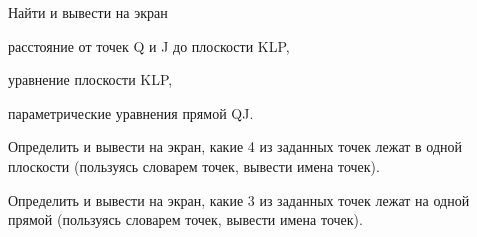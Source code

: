\documentclass[11pt]{report}
\begin{document}
 
Найти и вывести на экран


расстояние от точек Q и J до плоскости KLP,

 
уравнение плоскости KLP,

 
параметрические уравнения прямой QJ.


Определить и вывести на экран, какие 4 из заданных точек лежат в одной плоскости (пользуясь словарем точек, вывести имена точек).


Определить и вывести на экран, какие 3 из заданных точек лежат на одной прямой (пользуясь словарем точек, вывести имена точек).
\end{document}
